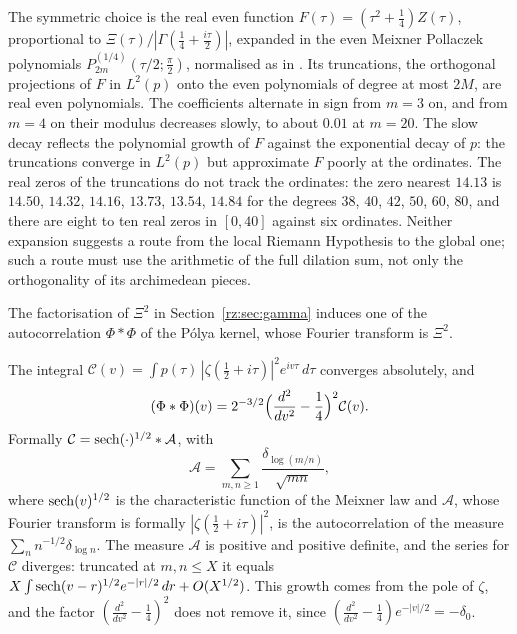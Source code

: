 The symmetric choice is the real even function $F(\tau)=(\tau^2+\frac14)Z(\tau)$, proportional to $\Xi(\tau)/|\Gamma(\frac14+\frac{i\tau}2)|$, expanded in the even Meixner Pollaczek polynomials $P_{2m}^{(1/4)}(\tau/2;\frac\pi2)$, normalised as in \cite[Section 9.7]{KLS}. Its truncations, the orthogonal projections of $F$ in $L^2(p)$ onto the even polynomials of degree at most $2M$, are real even polynomials. The coefficients alternate in sign from $m=3$ on, and from $m=4$ on their modulus decreases slowly, to about $0.01$ at $m=20$. The slow decay reflects the polynomial growth of $F$ against the exponential decay of $p$: the truncations converge in $L^2(p)$ but approximate $F$ poorly at the ordinates. The real zeros of the truncations do not track the ordinates: the zero nearest $14.13$ is $14.50$, $14.32$, $14.16$, $13.73$, $13.54$, $14.84$ for the degrees $38$, $40$, $42$, $50$, $60$, $80$, and there are eight to ten real zeros in $[0,40]$ against six ordinates. Neither expansion suggests a route from the local Riemann Hypothesis to the global one; such a route must use the arithmetic of the full dilation sum, not only the orthogonality of its archimedean pieces.

The factorisation of $\Xi^2$ in Section~\ref{rz:sec:gamma} induces one of the autocorrelation $\Phi*\Phi$ of the P\'olya kernel, whose Fourier transform is $\Xi^2$.

\begin{proposition}\label{rz:prop:autocorr}
The integral $\mathcal C(v)=\int p(\tau)\,|\zeta(\frac12+i\tau)|^2e^{iv\tau}\,d\tau$ converges absolutely, and
\[
(\Phi*\Phi)(v)=2^{-3/2}\Bigl(\frac{d^2}{dv^2}-\frac14\Bigr)^2\mathcal C(v).
\]
Formally $\mathcal C=\operatorname{sech}(\cdot)^{1/2}*\mathcal A$, with
\[
\mathcal A=\sum_{m,n\ge1}\frac{\delta_{\log(m/n)}}{\sqrt{mn}},
\]
where $\operatorname{sech}(v)^{1/2}$ is the characteristic function of the Meixner law and $\mathcal A$, whose Fourier transform is formally $|\zeta(\frac12+i\tau)|^2$, is the autocorrelation of the measure $\sum_nn^{-1/2}\delta_{\log n}$. The measure $\mathcal A$ is positive and positive definite, and the series for $\mathcal C$ diverges: truncated at $m,n\le X$ it equals $X\int\operatorname{sech}(v-r)^{1/2}e^{-|r|/2}\,dr+O(X^{1/2})$. This growth comes from the pole of $\zeta$, and the factor $(\frac{d^2}{dv^2}-\frac14)^2$ does not remove it, since $(\frac{d^2}{dv^2}-\frac14)e^{-|v|/2}=-\delta_0$.
\end{proposition}

